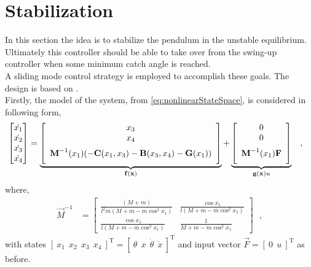 \chapter{Stabilization}
In this section the idea is to stabilize the pendulum in the unstable equilibrium. Ultimately this controller should be able to take over from the swing-up controller when some minimum catch angle is reached.\\
A sliding mode control strategy is employed to accomplish these goals. The design is based on \cite{HKKhalil}.\\
Firstly, the model of the system, from \autoref{eq:nonlinearStateSpace}, is considered in following form,
\begin{align}
  \begin{bmatrix}
    \dot{x_1} \\
    \dot{x_2} \\
    \dot{x_3} \\
    \dot{x_4}
  \end{bmatrix}
  &=
  \underbrace{
    \left[
      \begin{array}{c}
        x_3 \\
        x_4 \\
        \multirow{2}{*}{$ \vec{M}^{-1}(x_1) ( - \vec{C}(x_1,x_3) - \vec{B}(x_3,x_4) - \vec{G}(x_1) ) $}\\
        \phantom{eq}
      \end{array}
    \right]
  }_{\vec{f}(\vec{x})}
  +
  \underbrace{
    \left[
      \begin{array}{c}
        0 \\
        0 \\
        \multirow{2}{*}{$ \vec{M}^{-1}(x_1) \vec{F} $}\\
        \phantom{eq}
      \end{array}
    \right]
  }_{\vec{g}(\vec{x}) u}
\label{eq:nonlinearStateSpace2} \ \ \ ,
\end{align}
%
where,
\begin{align}
  \vec{M}^{-1}
  &=
  \begin{bmatrix}
    \frac{(M + m)}{l^2 m ( M + m - m \cos^2 x_1 )}  &  \frac{\cos x_1}{l (M + m - m \cos^2 x_1)} \\
    \frac{\cos x_1}{l (M + m - m \cos^2 x_1)}       &  \frac{1}{M + m - m \cos^2 x_1}
  \end{bmatrix}  \ \ \ ,
\end{align}
%
with states $ [\ x_1\ \ x_2\ \ x_3\ \ x_4\ ]^\mathrm{T} = [\ \theta\ \ x\ \ \dot{\theta}\ \ \dot{x}\ ]^\mathrm{T} $ and input vector $\vec{F} = [\ 0 \ \ u \ ]^\mathrm{T}$ as before.

